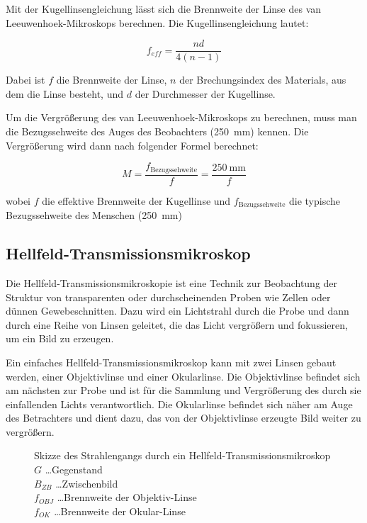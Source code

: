 \documentclass[12pt,english,ngerman]{scrartcl}
\begin{document}
Mit der Kugellinsengleichung lässt sich die Brennweite der Linse des van
Leeuwenhoek-Mikroskops berechnen. Die Kugellinsengleichung lautet:

\begin{equation}
	f_{eff}= \frac{nd}{4(n-1)}
	\label{eq:effektive_fokuslange}
\end{equation}

Dabei ist $f$ die Brennweite der Linse, $n$ der Brechungsindex des Materials,
aus dem die Linse besteht, und $d$ der Durchmesser der Kugellinse.

Um die Vergrößerung des van Leeuwenhoek-Mikroskops zu berechnen, muss man die
Bezugssehweite des Auges des Beobachters (\SI{250}{\mm}) kennen. Die
Vergrößerung wird dann nach folgender Formel berechnet:

\begin{equation}
	M = \frac{f_\text{Bezugssehweite}}{f}= \frac{\SI{250}{\mm}}{f}
	\label{eq:LeeuwenhoekVergroeserung}
\end{equation}

wobei $f$ die effektive Brennweite der Kugellinse und $f_\text{Bezugssehweite}$
die typische Bezugssehweite des Menschen (\SI{250}{\mm})

\subsection{Hellfeld-Transmissionsmikroskop}
Die Hellfeld-Transmissionsmikroskopie ist eine Technik zur Beobachtung der
Struktur von transparenten oder durchscheinenden Proben wie Zellen oder dünnen
Gewebeschnitten. Dazu wird ein Lichtstrahl durch die Probe und dann durch eine
Reihe von Linsen geleitet, die das Licht vergrößern und fokussieren, um ein
Bild zu erzeugen.

Ein einfaches Hellfeld-Transmissionsmikroskop kann mit zwei Linsen gebaut
werden, einer Objektivlinse und einer Okularlinse. Die Objektivlinse befindet
sich am nächsten zur Probe und ist für die Sammlung und Vergrößerung des durch
sie einfallenden Lichts verantwortlich. Die Okularlinse befindet sich näher am
Auge des Betrachters und dient dazu, das von der Objektivlinse erzeugte Bild
weiter zu vergrößern.

\begin{figure}[H]
	\begin{center}
	\end{center}
	\caption[Skizze des Strahlengangs durch ein Hellfeld-Transmissionsmikroskop] { Skizze
		des Strahlengangs durch ein Hellfeld-Transmissionsmikroskop \\
		$G$ \dots Gegenstand                                        \\
		$B_{ZB}$ \dots Zwischenbild                                 \\
		$f_{OBJ}$ \dots Brennweite der Objektiv-Linse               \\
		$f_{OK}$ \dots Brennweite der Okular-Linse
	}\label{fig:strahlengang_hellfeldmikroskop}
\end{figure}
\end{document}
